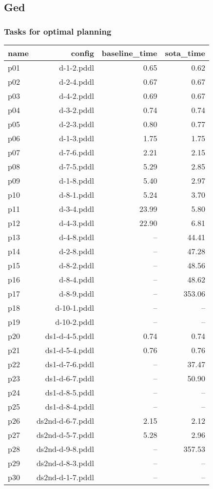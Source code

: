 \documentclass{article}
\begin{document}
                \newpage \subsection{Ged}
                    \subsubsection*{Tasks for optimal planning}
                    
                            \begin{center}
                            \scriptsize
                            \begin{tabular}{@{}l|r|r|r@{}}
                            name & config & baseline\_time & sota\_time\\\midrule
                              p01& d-1-2.pddl&0.65&0.62\\
  p02& d-2-4.pddl&0.67&0.67\\
  p03& d-4-2.pddl&0.69&0.67\\
  p04& d-3-2.pddl&0.74&0.74\\
  p05& d-2-3.pddl&0.80&0.77\\
  p06& d-1-3.pddl&1.75&1.75\\
  p07& d-7-6.pddl&2.21&2.15\\
  p08& d-7-5.pddl&5.29&2.85\\
  p09& d-1-8.pddl&5.40&2.97\\
  p10& d-8-1.pddl&5.24&3.70\\
  p11& d-3-4.pddl&23.99&5.80\\
  p12& d-4-3.pddl&22.90&6.81\\
  p13& d-4-8.pddl&--&44.41\\
  p14& d-2-8.pddl&--&47.28\\
  p15& d-8-2.pddl&--&48.56\\
  p16& d-8-4.pddl&--&48.62\\
  p17& d-8-9.pddl&--&353.06\\
  p18& d-10-1.pddl&--&--\\
  p19& d-10-2.pddl&--&--\\
  p20& ds1-d-4-5.pddl&0.74&0.74\\
  p21& ds1-d-5-4.pddl&0.76&0.76\\
  p22& ds1-d-7-6.pddl&--&37.47\\
  p23& ds1-d-6-7.pddl&--&50.90\\
  p24& ds1-d-8-5.pddl&--&--\\
  p25& ds1-d-8-4.pddl&--&--\\
  p26& ds2nd-d-6-7.pddl&2.15&2.12\\
  p27& ds2nd-d-5-7.pddl&5.28&2.96\\
  p28& ds2nd-d-9-8.pddl&--&357.53\\
  p29& ds2nd-d-8-3.pddl&--&--\\
  p30& ds2nd-d-1-7.pddl&--&--
                            \end{tabular}
                            \end{center}
                    
\end{document}
